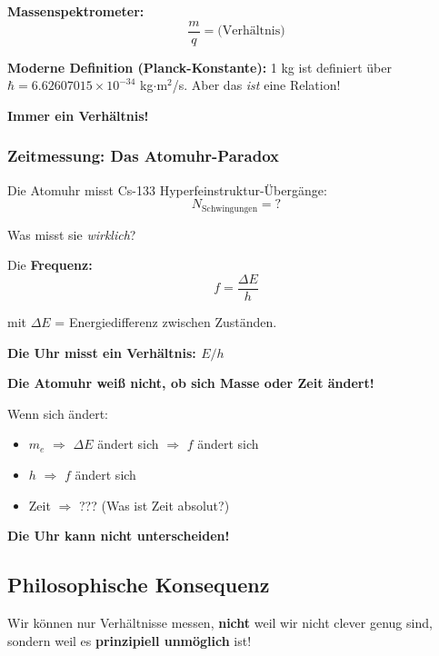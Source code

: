 \textbf{Massenspektrometer:}
\begin{equation}
	\frac{m}{q} = \text{(Verhältnis)}
\end{equation}

\textbf{Moderne Definition (Planck-Konstante):}
1 kg ist definiert über $\hbar = 6.62607015 \times 10^{-34}$ kg$\cdot$m$^2$/s. Aber das \textit{ist} eine Relation!

\textbf{Immer ein Verhältnis!}

\subsubsection{Zeitmessung: Das Atomuhr-Paradox}

Die Atomuhr misst Cs-133 Hyperfeinstruktur-Übergänge:
\begin{equation}
	N_\text{Schwingungen} = ?
\end{equation}

Was misst sie \textit{wirklich}?

Die \textbf{Frequenz:}
\begin{equation}
	f = \frac{\Delta E}{h}
\end{equation}

mit $\Delta E$ = Energiedifferenz zwischen Zuständen.

\textbf{Die Uhr misst ein Verhältnis: $E/h$}

\begin{critical}
	\textbf{Die Atomuhr weiß nicht, ob sich Masse oder Zeit ändert!}
	
	Wenn sich ändert:
	\begin{itemize}[nosep]
		\item $m_e$ $\Rightarrow$ $\Delta E$ ändert sich $\Rightarrow$ $f$ ändert sich
		\item $h$ $\Rightarrow$ $f$ ändert sich
		\item Zeit $\Rightarrow$ ??? (Was ist Zeit absolut?)
	\end{itemize}
	
	\textbf{Die Uhr kann nicht unterscheiden!}
\end{critical}

\subsection{Philosophische Konsequenz}

Wir können nur Verhältnisse messen, \textbf{nicht} weil wir nicht clever genug sind, sondern weil es \textbf{prinzipiell unmöglich} ist!

